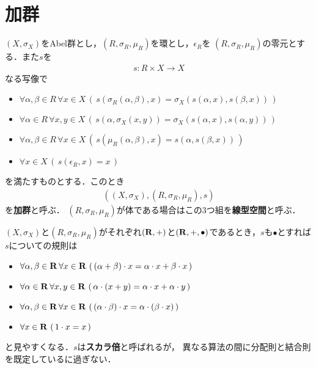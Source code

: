 \section{加群}
	\begin{screen}
		\begin{dfn}[加群]
			$(X,\sigma_X)$をAbel群とし，$(R,\sigma_R,\mu_R)$を環とし，$\epsilon_R$を
			$(R,\sigma_R,\mu_R)$の零元とする．また$s$を
			\begin{align}
				s:R \times X \longrightarrow X
			\end{align}
			なる写像で
			\begin{itemize}
				\item $\forall \alpha,\beta \in R\, \forall x \in X\, \left(\, s(\sigma_R(\alpha,\beta),x)
					= \sigma_X(s(\alpha,x),s(\beta,x))\, \right)$
				\item $\forall \alpha \in R\, \forall x,y \in X\, \left(\, s(\alpha,\sigma_X(x,y))
					= \sigma_X(s(\alpha,x),s(\alpha,y))\, \right)$
				\item $\forall \alpha,\beta \in R\, \forall x \in X\, \left(\, s(\mu_R(\alpha,\beta),x)
					= s(\alpha,s(\beta,x))\, \right)$
				\item $\forall x \in X\, \left(\, s(\epsilon_R,x) = x\, \right)$
			\end{itemize}
			を満たすものとする．このとき
			\begin{align}
				\left((X,\sigma_X),(R,\sigma_R,\mu_R),s\right)
			\end{align}
			を{\bf 加群}と呼ぶ．
			$(R,\sigma_R,\mu_R)$が体である場合はこの3つ組を{\bf 線型空間}と呼ぶ．
		\end{dfn}
	\end{screen}
	
	$(X,\sigma_X)$と$(R,\sigma_R,\mu_R)$がそれぞれ$(\mathbf{R},+)$と$(\mathbf{R},+,\bullet)$であるとき，$s$も$\bullet$とすれば
	$s$についての規則は
	\begin{itemize}
		\item $\forall \alpha,\beta \in \mathbf{R}\, \forall x \in \mathbf{R}\, \left(\, (\alpha + \beta) \cdot x
			= \alpha \cdot x + \beta \cdot x\, \right)$
		\item $\forall \alpha \in \mathbf{R}\, \forall x,y \in \mathbf{R}\, \left(\, \alpha \cdot (x+y)
			= \alpha \cdot x + \alpha \cdot y\, \right)$
		\item $\forall \alpha,\beta \in \mathbf{R}\, \forall x \in \mathbf{R}\, \left(\, (\alpha \cdot \beta) \cdot x
			= \alpha \cdot (\beta \cdot x)\, \right)$
		\item $\forall x \in \mathbf{R}\, \left(\, 1 \cdot x = x\, \right)$
	\end{itemize}
	と見やすくなる．$s$は{\bf スカラ倍}と呼ばれるが，
	異なる算法の間に分配則と結合則を既定しているに過ぎない．
